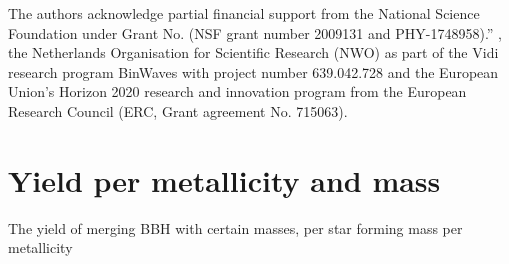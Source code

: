 \documentclass[twocolumn]{aastex631}
\begin{document}
\begin{acknowledgments}
The authors acknowledge partial financial support from the  National Science Foundation under Grant No. (NSF grant number 2009131  and PHY-1748958).”
, the Netherlands Organisation for Scientific Research (NWO) as part of the Vidi research program BinWaves with project number 639.042.728 and the European Union’s Horizon 2020 research and innovation program from the European Research Council (ERC, Grant agreement No. 715063). 
\end{acknowledgments}


\appendix

\section{Yield per metallicity and mass \label{app: mass metal yield}}
The yield of merging BBH with certain masses, per star forming mass per metallicity




\end{document}
